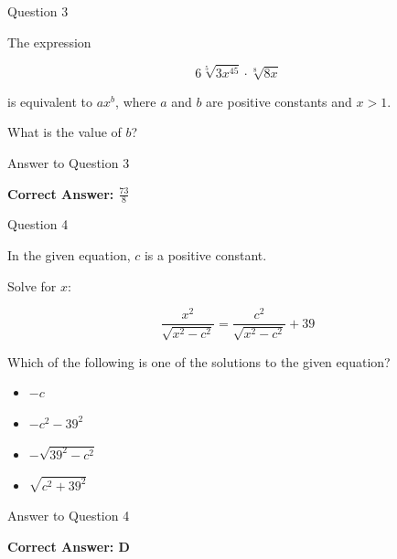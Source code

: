 \documentclass{beamer}
\begin{document}


\begin{frame}{Question 3}

The expression

\[
6\sqrt[5]{3x^{45}}\cdot \sqrt[8]{8x}
\]

is equivalent to $ax^b$, where $a$ and $b$ are positive constants and $x>1$.

What is the value of $b$?

\end{frame}

\begin{frame}{Answer to Question 3}

\textbf{Correct Answer: $\frac{73}{8}$}

\end{frame}


\begin{frame}{Question 4}

In the given equation, $c$ is a positive constant.

Solve for $x$:

\[
\frac{x^2}{\sqrt{x^2-c^2}}
=
\frac{c^2}{\sqrt{x^2-c^2}}+39
\]

Which of the following is one of the solutions to the given equation?

\begin{itemize}
    \item[A.] $-c$
    \item[B.] $-c^2-39^2$
    \item[C.] $-\sqrt{39^2-c^2}$
    \item[D.] $\sqrt{c^2+39^2}$
\end{itemize}

\end{frame}

\begin{frame}{Answer to Question 4}

\textbf{Correct Answer: D}

\end{frame}
\end{document}
